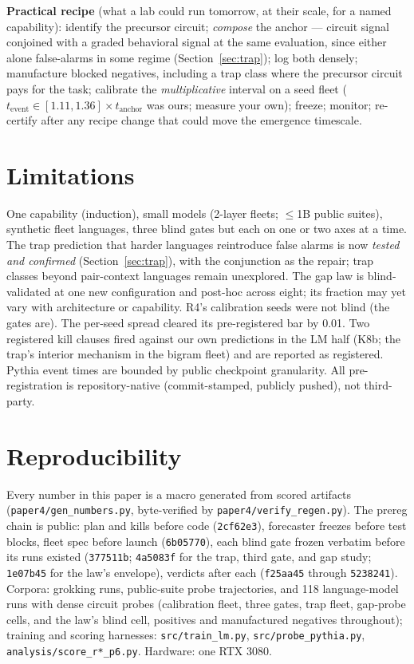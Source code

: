 \documentclass[11pt]{article}
\newcommand{\tev}{t_{\mathrm{event}}}
\begin{document}
\textbf{Practical recipe} (what a lab could run tomorrow, at their scale, for a named
capability): identify the precursor circuit; \emph{compose} the anchor --- circuit
signal conjoined with a graded behavioral signal at the same evaluation, since either
alone false-alarms in some regime (Section~\ref{sec:trap}); log both densely;
manufacture blocked negatives, including a trap class where the precursor circuit pays
for the task; calibrate the \emph{multiplicative} interval on a seed fleet
($\tev \in [1.11, 1.36] \times t_{\mathrm{anchor}}$ was ours; measure your own); freeze;
monitor; re-certify after any recipe change that could move the emergence timescale.

\section{Limitations}
\label{sec:limits}

One capability (induction), small models (2-layer fleets; $\leq$1B public suites),
synthetic fleet languages, three blind gates but each on one or two axes at a time. The
trap prediction that harder languages reintroduce false alarms is now \emph{tested and
confirmed} (Section~\ref{sec:trap}), with the conjunction as the repair; trap classes
beyond pair-context languages remain unexplored. The gap law is blind-validated at one
new configuration and post-hoc across eight; its fraction may yet vary with architecture
or capability. R4's calibration seeds were not blind (the gates are). The per-seed
spread cleared its pre-registered bar by 0.01. Two registered kill clauses fired against
our own predictions in the LM half (K8b; the trap's interior mechanism in the bigram
fleet) and are reported as registered. Pythia event times are bounded by public
checkpoint granularity. All pre-registration is repository-native (commit-stamped,
publicly pushed), not third-party.

\section{Reproducibility}
\label{sec:repro}

\begin{sloppypar}
Every number in this paper is a macro generated from scored artifacts
(\texttt{paper4/gen\_numbers.py}, byte-verified by \texttt{paper4/verify\_regen.py}).
The prereg chain is public: plan and kills before code (\texttt{2cf62e3}), forecaster
freezes before test blocks, fleet spec before launch (\texttt{6b05770}), each blind gate
frozen verbatim before its runs existed (\texttt{377511b}; \texttt{4a5083f} for the
trap, third gate, and gap study; \texttt{1e07b45} for the law's envelope), verdicts
after each (\texttt{f25aa45} through \texttt{5238241}). Corpora: \vCorpus{} grokking
runs, \wPythiaRuns{} public-suite probe trajectories, and 118 language-model runs with
dense circuit probes (calibration fleet, three gates, trap fleet, gap-probe cells, and
the law's blind cell, positives and manufactured negatives throughout); training and
scoring harnesses: \texttt{src/train\_lm.py}, \texttt{src/probe\_pythia.py},
\texttt{analysis/score\_r*\_p6.py}. Hardware: one RTX 3080.
\end{sloppypar}



\end{document}
